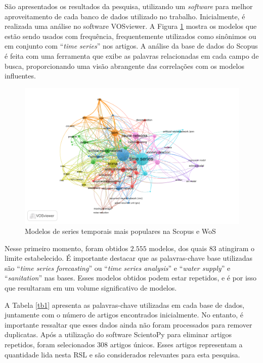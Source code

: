 São apresentados os resultados da pesquisa, utilizando um \textit{software} para melhor aproveitamento de cada banco de dados utilizado no trabalho. Inicialmente, é realizada uma análise no software VOSviewer.
A Figura \ref{fig:scopus-09-08} mostra os modelos que estão sendo usados com frequência, frequentemente utilizados como sinônimos ou em conjunto com ``\textit{time series}'' nos artigos. A análise da base de dados do Scopus é feita com uma ferramenta que exibe as palavras relacionadas em cada campo de busca, proporcionando uma visão abrangente das correlações com os modelos influentes.

\begin{figure}[H]
	\centering
	\caption{Modelos de series temporais mais populares na Scopus e WoS }
	\label{fig:scopus-09-08}
	\includegraphics[width=\linewidth]{Revisao/Figuras/base-wos-scopus}
	
	
\end{figure}

Nesse primeiro momento, foram obtidos $2.555$ modelos, dos quais $83$ atingiram o limite estabelecido. É importante destacar que as palavras-chave base utilizadas são ``\textit{time series forecasting}'' ou ``\textit{time series analysis}'' e ``\textit{water supply}'' e ``\textit{sanitation}'' nas bases. Esses modelos obtidos podem estar repetidos, e é por isso que resultaram em um volume significativo de modelos.


A Tabela \ref{tb1} apresenta as palavras-chave utilizadas em cada base de dados, juntamente com o número de artigos encontrados inicialmente. No entanto, é importante ressaltar que esses dados ainda não foram processados para remover duplicatas. Após a utilização do software ScientoPy \cite{scientopy} para eliminar artigos repetidos, foram selecionados $308$ artigos únicos. Esses artigos representam a quantidade lida nesta RSL e são considerados relevantes para esta pesquisa.


